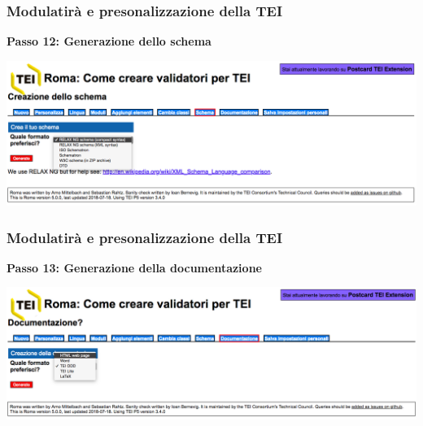 \begin{frame}
    \frametitle{Modulatirà e presonalizzazione della TEI}
    \addtocounter{nframe}{1}
   
   
    \textbf{Passo 12: Generazione dello schema}

     \begin{center}
        \includegraphics[width=.9\textwidth]{imgs/Roma12.png}
     \end{center}
   
    
\end{frame}

\begin{frame}
    \frametitle{Modulatirà e presonalizzazione della TEI}
    \addtocounter{nframe}{1}
    
    \textbf{Passo 13: Generazione della documentazione}

     \begin{center}
        \includegraphics[width=.95\textwidth]{imgs/Roma13.png}
     \end{center}
    
\end{frame}

